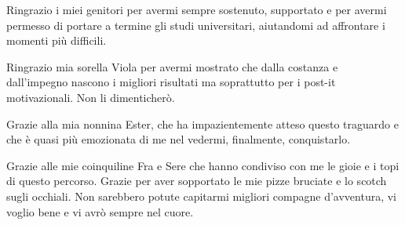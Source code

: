 

\bigskip \noindent
Ringrazio i miei genitori per avermi sempre sostenuto, supportato e per avermi permesso di portare a termine gli studi universitari, aiutandomi ad affrontare i momenti più difficili. 

\bigskip \noindent
Ringrazio mia sorella Viola per avermi mostrato che dalla costanza e dall'impegno nascono i migliori risultati ma soprattutto per i post-it motivazionali. Non li dimenticherò. 

\bigskip \noindent
Grazie alla mia nonnina Ester, che ha impazientemente atteso questo traguardo e che è quasi più emozionata di me nel vedermi, finalmente, conquistarlo.

\bigskip \noindent
Grazie alle mie coinquiline Fra e Sere che hanno condiviso con me le gioie e i topi di questo percorso. Grazie per aver sopportato le mie pizze bruciate e lo scotch sugli occhiali. Non sarebbero potute capitarmi migliori compagne d'avventura, vi voglio bene e vi avrò sempre nel cuore. 

